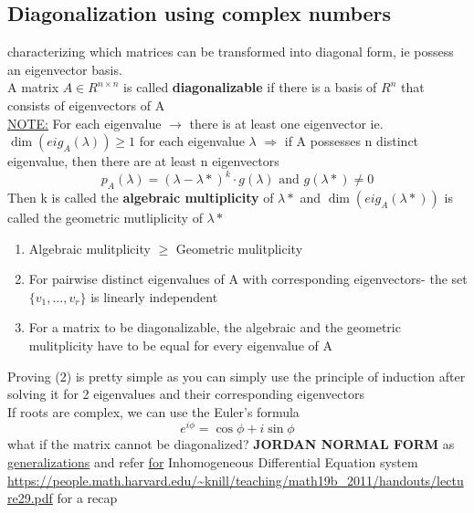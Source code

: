 \documentclass{article}
\begin{document}
\subsection*{Diagonalization using complex numbers} 
characterizing which matrices can be transformed into diagonal form, ie possess an eigenvector basis. \\
A matrix $A\in R^{n\times n}$ is called \textbf{diagonalizable} if there is a basis of $R^{n}$ that consists of eigenvectors of A\\[2pt]
\underline{NOTE:} For each eigenvalue $\rightarrow$ there is at least one eigenvector ie. $\dim(eig_A(\lambda)) \geq 1$ for each eigenvalue $\lambda$ 
$\Rightarrow$ if A possesses n distinct eigenvalue, then there are at least n eigenvectors \\
\begin{equation*} p_A(\lambda) = {(\lambda - \lambda*)}^k \cdot g(\lambda) \text{   and  } g(\lambda*) \neq 0 \end{equation*}
Then k is called the \textbf{algebraic multiplicity} of $\lambda*$ and $\dim(eig_A(\lambda*))$ is called the geometric mutliplicity of $\lambda*$
\begin{enumerate}
    \item Algebraic mulitplicity $\geq$ Geometric mulitplicity
    \item For pairwise distinct eigenvalues of A with corresponding eigenvectors- the set $\{v_1, \dots, v_r\}$ is linearly independent
    \item For a matrix to be diagonalizable, the algebraic and the geometric mulitplicity have to be equal for every eigenvalue of A 
\end{enumerate}
Proving (2) is pretty simple as you can simply use the principle of induction after solving it for 2 eigenvalues and their corresponding eigenvectors
\\ If roots are complex, we can use the Euler's formula \begin{equation*} e^{i \phi} = \cos\phi + i \sin \phi \end{equation*}
what if the matrix cannot be diagonalized? \textbf{JORDAN NORMAL FORM} as \href{https://en.wikipedia.org/wiki/Jordan_normal_form}{generalizations} and refer \href{https://shorturl.at/9Vxni}{for} Inhomogeneous Differential Equation system 
\\\url{https://people.math.harvard.edu/~knill/teaching/math19b_2011/handouts/lecture29.pdf} for a recap
\end{document}
